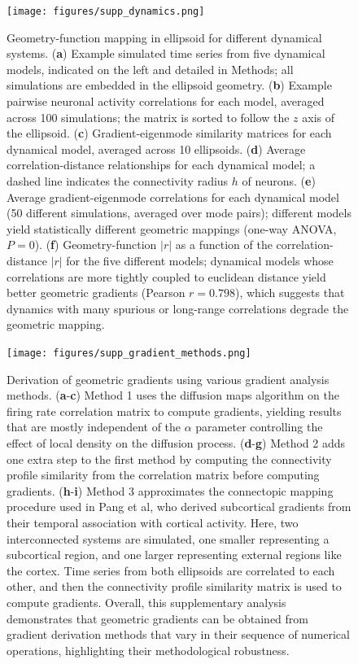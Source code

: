 \documentclass{article}
\begin{document}
\newpage

\begin{figure}[t]
    \centering
    \texttt{[image: figures/supp\_dynamics.png]}
    \caption{Geometry-function mapping in ellipsoid for different dynamical systems. (\textbf{a}) Example simulated time series from five dynamical models, indicated on the left and detailed in Methods; all simulations are embedded in the ellipsoid geometry. (\textbf{b}) Example pairwise neuronal activity correlations for each model, averaged across 100 simulations; the matrix is sorted to follow the $z$ axis of the ellipsoid. (\textbf{c}) Gradient-eigenmode similarity matrices for each dynamical model, averaged across 10 ellipsoids. (\textbf{d}) Average correlation-distance relationships for each dynamical model; a dashed line indicates the connectivity radius $h$ of neurons. (\textbf{e}) Average gradient-eigenmode correlations for each dynamical model (50 different simulations, averaged over mode pairs); different models yield statistically different geometric mappings (one-way ANOVA, $P=0$). (\textbf{f}) Geometry-function $|r|$ as a function of the correlation-distance $|r|$ for the five different models; dynamical models whose correlations are more tightly coupled to euclidean distance yield better geometric gradients (Pearson $r=0.798$), which suggests that dynamics with many spurious or long-range correlations degrade the geometric mapping. }
    \label{supp_dynamics}
\end{figure}

\newpage

\begin{figure}[t]
    \centering
    \texttt{[image: figures/supp\_gradient\_methods.png]}
    \caption{Derivation of geometric gradients using various gradient analysis methods. (\textbf{a}-\textbf{c}) Method 1 uses the diffusion maps algorithm on the firing rate correlation matrix to compute gradients, yielding results that are mostly independent of the $\alpha$ parameter controlling the effect of local density on the diffusion process. (\textbf{d}-\textbf{g}) Method 2 adds one extra step to the first method by computing the connectivity profile similarity from the correlation matrix before computing gradients. (\textbf{h}-\textbf{i}) Method 3 approximates the connectopic mapping procedure used in Pang et al, who derived subcortical gradients from their temporal association with cortical activity. Here, two interconnected systems are simulated, one smaller representing a subcortical region, and one larger representing external regions like the cortex. Time series from both ellipsoids are correlated to each other, and then the connectivity profile similarity matrix is used to compute gradients. Overall, this supplementary analysis demonstrates that geometric gradients can be obtained from gradient derivation methods that vary in their sequence of numerical operations, highlighting their methodological robustness.}
    \label{supp_methods}
\end{figure}
\end{document}
